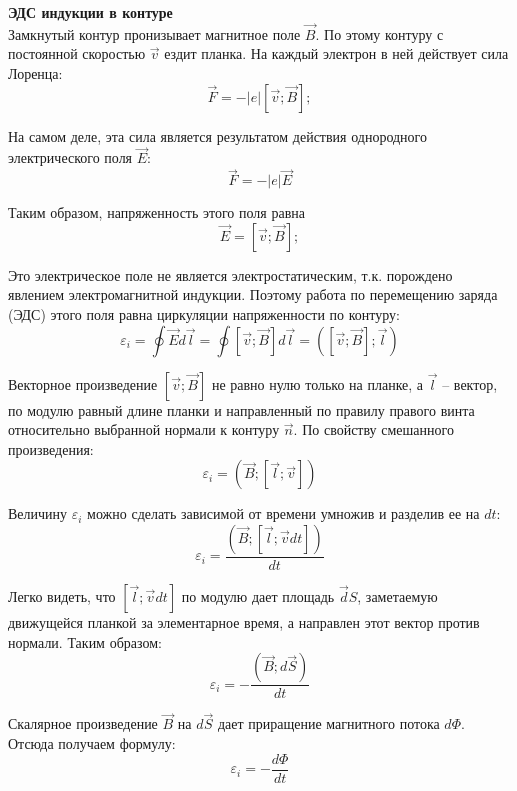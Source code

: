 \documentclass{article}
\begin{document}
	\textbf{ЭДС индукции в контуре}\\

	Замкнутый контур пронизывает магнитное поле $\vec B$.
	По этому контуру с постоянной скоростью $\vec v$ ездит планка. На каждый электрон в ней действует сила Лоренца:
	\begin{equation}
		\vec F = -|e|[\vec v;\vec B];
	\end{equation}

	На самом деле, эта сила является результатом действия однородного электрического поля $\vec E$:
	\begin{equation}
		\vec F = -|e|\vec E
	\end{equation}

	Таким образом, напряженность этого поля равна
	\begin{equation}
		\vec E = [\vec v;\vec B];
	\end{equation}

	Это электрическое поле не является электростатическим, т.к. порождено явлением электромагнитной индукции. Поэтому работа по перемещению заряда (ЭДС) этого поля равна циркуляции напряженности по контуру:
	\begin{equation}
		\varepsilon_i = \oint{\vec E d\vec l} = \oint{[\vec v;\vec B] d\vec l} = ([\vec v;\vec B];\vec l)
	\end{equation}

	Векторное произведение $[\vec v;\vec B]$ не равно нулю только на планке, а $\vec l$ -- вектор, по модулю равный длине планки и направленный по правилу правого винта относительно выбранной нормали к контуру $\vec n$. По свойству смешанного произведения:
	\begin{equation}
		\varepsilon_i = (\vec B;[\vec l;\vec v])
	\end{equation}

	Величину $\varepsilon_i$ можно сделать зависимой от времени умножив и разделив ее на $dt$:
	\begin{equation}
		\varepsilon_i = \frac{(\vec B;[\vec l;\vec vdt])}{dt}
	\end{equation}

	Легко видеть, что $[\vec l;\vec vdt]$ по модулю дает площадь $\vec dS$, заметаемую движущейся планкой за элементарное время, а направлен этот вектор против нормали. Таким образом:
	\begin{equation}
		\varepsilon_i = -\frac{(\vec B; d\vec S)}{dt}
	\end{equation}

	Скалярное произведение $\vec B$ на $d\vec S$ дает приращение магнитного потока $d\Phi$. Отсюда получаем формулу:
	\begin{equation}
		\varepsilon_i = -\frac{d\Phi}{dt}
	\end{equation}
\end{document}

